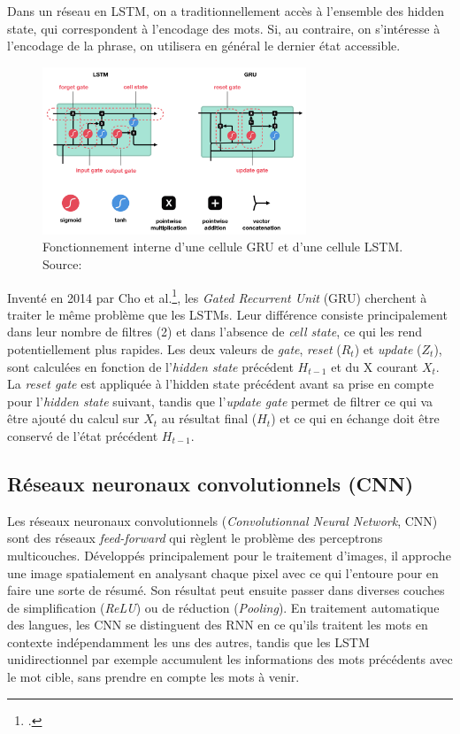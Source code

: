 Dans un réseau en LSTM, on a traditionnellement accès à l'ensemble des hidden state, qui correspondent à l'encodage des mots. Si, au contraire, on s'intéresse à l'encodage de la phrase, on utilisera en général le dernier état accessible.

\begin{figure}[h]
    \centering
    \includegraphics[height=5cm]{results/deep-learning/explanations/GRU LSTM.png}
    \caption{Fonctionnement interne d'une cellule GRU et d'une cellule LSTM. Source: \cite{nguyen_illustrated_2019}}
    \label{fig:deep-learning:lstm-gru}
\end{figure}


\label{deep-learning:gru}
Inventé en 2014 par Cho et al.\footcite{cho_properties_2014}, les \textit{Gated Recurrent Unit} (GRU) cherchent à traiter le même problème que les LSTMs. Leur différence consiste principalement dans leur nombre de filtres (2) et dans l'absence de \textit{cell state}, ce qui les rend potentiellement plus rapides. Les deux valeurs de \textit{gate}, \textit{reset} ($R_{t}$) et \textit{update} ($Z_{t}$), sont calculées en fonction de l'\textit{hidden state} précédent $H_{t-1}$ et du X courant $X_{t}$. La \textit{reset gate} est appliquée à l'hidden state précédent avant sa prise en compte pour l'\textit{hidden state} suivant, tandis que l'\textit{update gate} permet de filtrer ce qui va être ajouté du calcul sur $X_{t}$ au résultat final ($H_{t}$) et ce qui en échange doit être conservé de l'état précédent $H_{t-1}$.


\subsection{Réseaux neuronaux convolutionnels (CNN)}
\label{deep-learning:CNN}

Les réseaux neuronaux convolutionnels (\textit{Convolutionnal Neural Network}, CNN) sont des réseaux \textit{feed-forward} qui règlent le problème des perceptrons multicouches. Développés principalement pour le traitement d'images, il approche une image spatialement en analysant chaque pixel avec ce qui l'entoure pour en faire une sorte de résumé. Son résultat peut ensuite passer dans diverses couches de simplification (\textit{ReLU}) ou de réduction (\textit{Pooling}). En traitement automatique des langues, les CNN se distinguent des RNN en ce qu'ils traitent les mots en contexte indépendamment les uns des autres, tandis que les LSTM unidirectionnel par exemple accumulent les informations des mots précédents avec le mot cible, sans prendre en compte les mots à venir.

